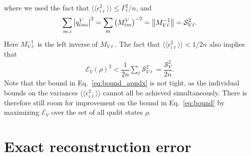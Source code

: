 \documentclass[nofootinbib,twocolumn]{revtex4-1}
\newcommand{\f}[2]{\dfrac{#1}{#2}} %
\newcommand{\p}[1]{\left(#1\right)} %
\newcommand{\bbk}[1]{\langle\!\langle #1 \rangle\!\rangle}
\newcommand{\E}{\mathcal{E}}
\renewcommand{\S}{\mathcal{S}}
\begin{document}
where we used the fact that $\bbk{\epsilon_{i\ell}^2}\le\Gamma_\ell^2/n$, and
\begin{align}
  \sum_{m,i} \abs{q^V_{\ell mi}}^2
  = \sum_m \p{M^V_{\ell m}}^{-2}
  = \norm{M_{V\ell}^{-1}}
  = \S_{V\ell}^2.
\end{align}
Here $M_{V\ell}^{-1}$ is the left inverse of $M_{V\ell}$.
The fact that $\bbk{\epsilon_{i\ell}^2}<1/2n$ also implies that
\begin{align}
  \E_V\p{\rho}^2 < \f1{2n} \sum_\ell \S_{V\ell}^2 = \f{\S_V^2}{2n}.
\end{align}
Note that the bound in Eq.~\eqref{eq:bound_apndx} is not tight, as the individual bounds on the variances $\bbk{\epsilon_{i\ell}^2}$ cannot all be achieved simultaneously.
There is therefore still room for improvement on the bound in Eq.~\eqref{eq:bound} by maximizing $\E_V$ over the set of all qudit states $\rho$.

\section{Exact reconstruction error}
\label{sec:exact}
\end{document}
